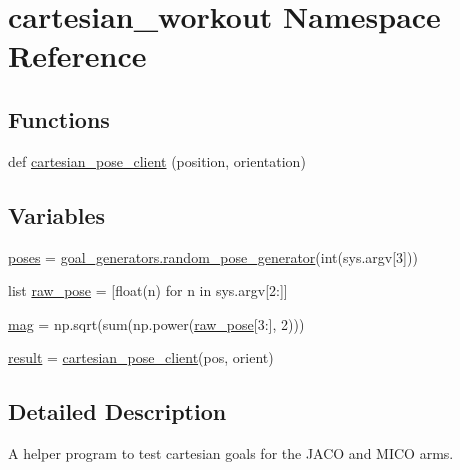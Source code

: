 \hypertarget{namespacecartesian__workout}{}\section{cartesian\+\_\+workout Namespace Reference}
\label{namespacecartesian__workout}
\subsection*{Functions}
\begin{DoxyCompactItemize}
\item 
def \hyperlink{namespacecartesian__workout_a1fb7cd9a49c4af0ae2cf8cab45335d40}{cartesian\+\_\+pose\+\_\+client} (position, orientation)
\end{DoxyCompactItemize}
\subsection*{Variables}
\begin{DoxyCompactItemize}
\item 
\hyperlink{namespacecartesian__workout_ab293192d190a24c9cb8edbea4ef33862}{poses} = \hyperlink{namespacegoal__generators_acc20fd60c84b4f30491d22bf16139668}{goal\+\_\+generators.\+random\+\_\+pose\+\_\+generator}(int(sys.\+argv\mbox{[}3\mbox{]}))
\item 
list \hyperlink{namespacecartesian__workout_a967ea83284096aa4c94c0b41daa5df6c}{raw\+\_\+pose} = \mbox{[}float(n) for n in sys.\+argv\mbox{[}2\+:\mbox{]}\mbox{]}
\item 
\hyperlink{namespacecartesian__workout_a9cc10da8ef79d18715644543b9794d80}{mag} = np.\+sqrt(sum(np.\+power(\hyperlink{namespacecartesian__workout_a967ea83284096aa4c94c0b41daa5df6c}{raw\+\_\+pose}\mbox{[}3\+:\mbox{]}, 2)))
\item 
\hyperlink{namespacecartesian__workout_ac2ac6ec3a92f53155c4912cbf5c93604}{result} = \hyperlink{namespacecartesian__workout_a1fb7cd9a49c4af0ae2cf8cab45335d40}{cartesian\+\_\+pose\+\_\+client}(pos, orient)
\end{DoxyCompactItemize}


\subsection{Detailed Description}
\begin{DoxyVerb}A helper program to test cartesian goals for the JACO and MICO arms.\end{DoxyVerb}
 

